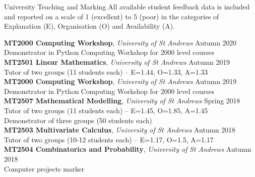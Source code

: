 \documentclass{resume} %
\begin{document}
\begin{rSection}{University Teaching and Marking}
All available student feedback data is included and reported on a scale of 1 (excellent) to 5 (poor) in the categories
of Explanation (E), Organisation (O) and Availability (A). 

{\bf MT2000 Computing Workshop}, {\em University of St Andrews} \hfill {Autumn 2020} \\
{Demonstrator in Python Computing Workshop for 2000 level courses} \\
{\bf MT2501 Linear Mathematics}, {\em University of St Andrews} \hfill {Autumn 2019} \\
{Tutor of two groups (11 students each)} -- E=1.44, O=1.33, A=1.33 \\
{\bf MT2000 Computing Workshop}, {\em University of St Andrews} \hfill {Autumn 2019} \\
{Demonstrator in Python Computing Workshop for 2000 level courses} \\
{\bf MT2507 Mathematical Modelling}, {\em University of St Andrews} \hfill {Spring 2018} \\
{Tutor of two groups (11 students each) -- E=1.45, O=1.85, A=1.45} \\
{Demonstrator of three groups (50 students each)} \\
{\bf MT2503 Multivariate Calculus}, {\em University of St Andrews} \hfill {Autumn 2018} \\
{Tutor of two groups (10-12 students each) -- E=1.17, O=1.5, A=1.17} \\
{\bf MT2504 Combinatorics and Probability}, {\em University of St Andrews} \hfill {Autumn 2018} \\
{Computer projects marker} 
\end{rSection}
\end{document}
